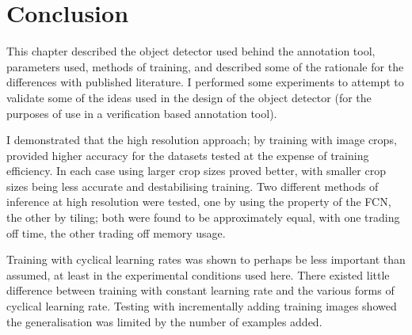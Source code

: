 



\section {Conclusion}

This chapter described the object detector used behind the annotation tool, parameters used, methods of training, and described some of the rationale for the differences with published literature. I performed some experiments to attempt to validate some of the ideas used in the design of the object detector (for the purposes of use in a verification based annotation tool). 

I demonstrated that the high resolution approach; by training with image crops, provided higher accuracy for the datasets tested at the expense of training efficiency. In each case using larger crop sizes proved better, with smaller crop sizes being less accurate and destabilising training. Two different methods of inference at high resolution were tested, one by using the property of the \gls{FCN}, the other by tiling; both were found to be approximately equal, with one trading off time, the other trading off memory usage.

Training with cyclical learning rates was shown to perhaps be less important than assumed, at least in the experimental conditions used here. There existed little difference between training with constant learning rate and the various forms of cyclical learning rate. Testing with incrementally adding training images showed the generalisation was limited by the number of examples added.

